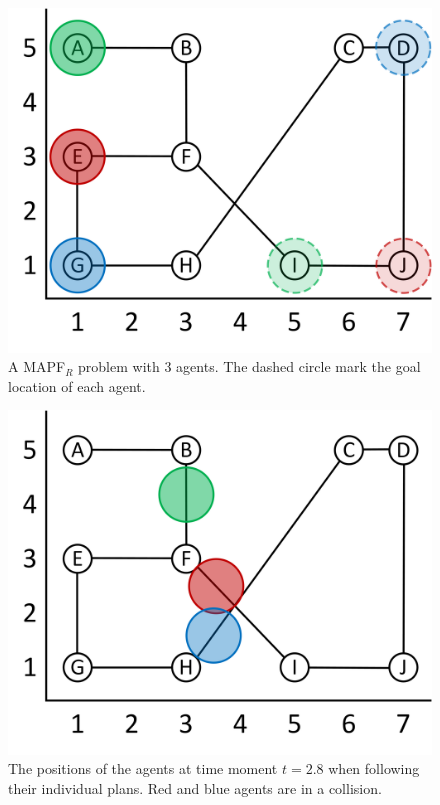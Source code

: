 \documentclass[review]{elsarticle}
\newcommand{\target}{\ensuremath{G}\xspace}
\newcommand{\source}{\ensuremath{S}\xspace}
\newcommand\konstantin[1]{\nb{\textbf{Konstantin:}}{red}{#1}}
\newcommand{\mapfr}{\ac{MAPF}$_R$\xspace}
\newcommand{\coord}{\textit{coord}\xspace}
\begin{document}




\begin{figure}
    \centering
    \includegraphics[width=0.6\columnwidth]{running_example.png}
    \caption{A \mapfr problem with 3 agents. The dashed circle mark the goal location of each agent.}
    \label{fig:example}
\end{figure}

\begin{figure}
    \centering
    \includegraphics[width=0.6\columnwidth]{running_example_t2-8.png}
    \caption{The positions of the agents at time moment $t=2.8$ when following their individual plans. Red and blue agents are in a collision.}
    \label{fig:example-t-2-8}
\end{figure}
\end{document}
